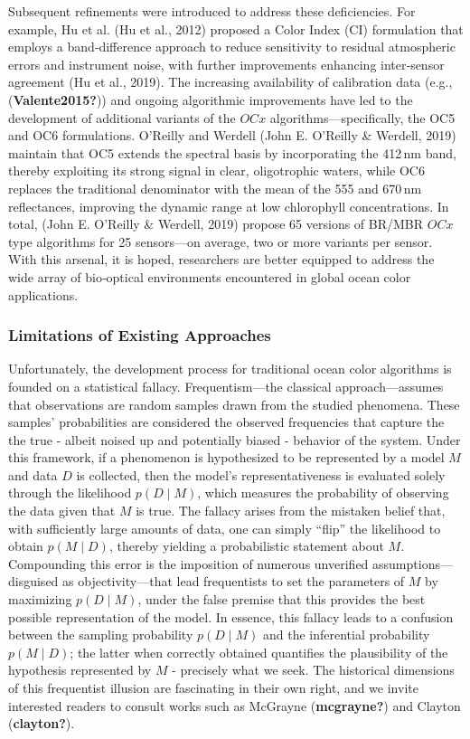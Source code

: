 \documentclass[
]{agujournal2019}
\begin{document}
Subsequent refinements were introduced to address these deficiencies.
For example, Hu et al. (Hu et al., 2012) proposed a Color Index (CI)
formulation that employs a band‑difference approach to reduce
sensitivity to residual atmospheric errors and instrument noise, with
further improvements enhancing inter‑sensor agreement (Hu et al., 2019).
The increasing availability of calibration data (e.g.,
(\textbf{Valente2015?})) and ongoing algorithmic improvements have led
to the development of additional variants of the \(OCx\)
algorithms---specifically, the OC5 and OC6 formulations. O'Reilly and
Werdell (John E. O'Reilly \& Werdell, 2019) maintain that OC5 extends
the spectral basis by incorporating the 412\,nm band, thereby exploiting
its strong signal in clear, oligotrophic waters, while OC6 replaces the
traditional denominator with the mean of the 555 and 670\,nm
reflectances, improving the dynamic range at low chlorophyll
concentrations. In total, (John E. O'Reilly \& Werdell, 2019) propose 65
versions of BR/MBR \(OCx\) type algorithms for 25 sensors---on average,
two or more variants per sensor. With this arsenal, it is hoped,
researchers are better equipped to address the wide array of bio‑optical
environments encountered in global ocean color applications.

\subsubsection{Limitations of Existing
Approaches}\label{limitations-of-existing-approaches}

Unfortunately, the development process for traditional ocean color
algorithms is founded on a statistical fallacy. Frequentism---the
classical approach---assumes that observations are random samples drawn
from the studied phenomena. These samples' probabilities are considered
the observed frequencies that capture the the true - albeit noised up
and potentially biased - behavior of the system. Under this framework,
if a phenomenon is hypothesized to be represented by a model \(M\) and
data \(D\) is collected, then the model's representativeness is
evaluated solely through the likelihood \(p(D∣M)\), which measures the
probability of observing the data given that \(M\) is true. The fallacy
arises from the mistaken belief that, with sufficiently large amounts of
data, one can simply ``flip'' the likelihood to obtain \(p(M∣D)\),
thereby yielding a probabilistic statement about \(M\). Compounding this
error is the imposition of numerous unverified assumptions---disguised
as objectivity---that lead frequentists to set the parameters of \(M\)
by maximizing \(p(D∣M)\), under the false premise that this provides the
best possible representation of the model. In essence, this fallacy
leads to a confusion between the sampling probability \(p(D∣M)\) and the
inferential probability \(p(M∣D)\); the latter when correctly obtained
quantifies the plausibility of the hypothesis represented by \(M\) -
precisely what we seek. The historical dimensions of this frequentist
illusion are fascinating in their own right, and we invite interested
readers to consult works such as McGrayne (\textbf{mcgrayne?}) and
Clayton (\textbf{clayton?}).
\end{document}
